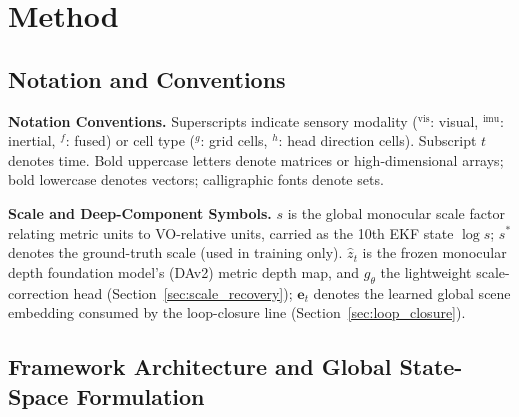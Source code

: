 \section{Method}
\label{sec:method}

\subsection{Notation and Conventions}
\label{sec:notation}
\textbf{Notation Conventions.} Superscripts indicate sensory modality ($^{\text{vis}}$: visual, $^{\text{imu}}$: inertial, $^f$: fused) or cell type ($^g$: grid cells, $^h$: head direction cells). Subscript $t$ denotes time. Bold uppercase letters denote matrices or high-dimensional arrays; bold lowercase denotes vectors; calligraphic fonts denote sets.

\textbf{Scale and Deep-Component Symbols.} $s$ is the global monocular scale factor relating metric units to VO-relative units, carried as the 10th EKF state $\log s$; $s^{*}$ denotes the ground-truth scale (used in training only). $\hat z_t$ is the frozen monocular depth foundation model's (DAv2) metric depth map, and $g_\theta$ the lightweight scale-correction head (Section~\ref{sec:scale_recovery}); $\boldsymbol{e}_t$ denotes the learned global scene embedding consumed by the loop-closure line (Section~\ref{sec:loop_closure}).

\subsection{Framework Architecture and Global State-Space Formulation}
\label{sec:framework_arch}


